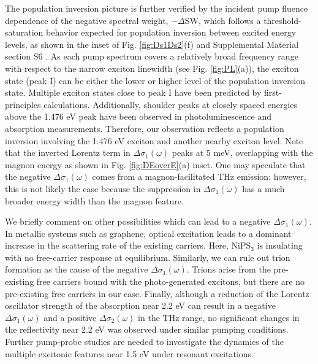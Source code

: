 \documentclass[%
 reprint,
superscriptaddress,
 amsmath,amssymb,
 aps,
]{revtex4-2}
\begin{document}
The population inversion picture is further verified by the incident pump fluence dependence of the negative spectral weight, $-\Delta$SW, which follows a threshold-saturation behavior expected for population inversion between excited energy levels, as shown in the inset of Fig. \ref{fig:Ds1Ds2}(f) and Supplemental Material section S6 \cite{Supp}. As each pump spectrum covers a relatively broad frequency range with respect to the narrow exciton linewidth (see Fig. \ref{fig:PL}(a)), the exciton state (peak I) can be either the lower or higher level of the population inversion state. Multiple exciton states close to peak I have been predicted by first-principles calculations\cite{Lane2022,Hamad2024}. Additionally, shoulder peaks at closely spaced energies above the 1.476 eV peak have been observed in photoluminescence and absorption measurements\cite{Kang2020}. Therefore, our observation reflects a population inversion involving the 1.476 eV exciton and another nearby exciton level. Note that the inverted Lorentz term in $\Delta\sigma_1(\omega)$ peaks at 5 meV, overlapping with the magnon energy as shown in Fig. \ref{fig:DEoverE}(a) inset. One may speculate that the negative $\Delta\sigma_1(\omega)$ comes from a magnon-facilitated THz emission; however, this is not likely the case because the suppression in $\Delta\sigma_1(\omega)$ has a much broader energy width than the magnon feature\cite{Belvin2021}. 



We briefly comment on other possibilities which can lead to a negative $\Delta\sigma_1(\omega)$. In metallic systems such as graphene, optical excitation leads to a dominant increase in the scattering rate of the existing carriers\cite{Jnawali2013, Frenzel2014}. Here, NiPS$_3$ is insulating with no free-carrier response at equilibrium. Similarly, we can rule out trion formation as the cause of the negative $\Delta\sigma_1(\omega)$. Trions arise from the pre-existing free carriers bound with the photo-generated excitons\cite{Liu2014}, but there are no pre-existing free carriers in our case. Finally, although a reduction of the Lorentz oscillator strength of the absorption near 2.2 eV\cite{Kim2018} can result in a negative $\Delta\sigma_1(\omega)$ and a positive $\Delta\sigma_2(\omega)$ in the THz range, no significant changes in the reflectivity near 2.2 eV was observed under similar pumping conditions\cite{Ergeçen2022}. Further pump-probe studies are needed to investigate the dynamics of the multiple excitonic features near 1.5 eV under resonant excitations.
\end{document}
